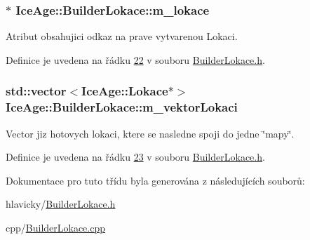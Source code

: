 \subsubsection[{\texorpdfstring{m\+\_\+lokace}{m_lokace}}]{$\ast$ Ice\+Age\+::\+Builder\+Lokace\+::m\+\_\+lokace\hspace{0.3cm}{\ttfamily [private]}}\hypertarget{classIceAge_1_1BuilderLokace_aad0fb17bf38c03cd767e100758348f24}{}\label{classIceAge_1_1BuilderLokace_aad0fb17bf38c03cd767e100758348f24}


Atribut obsahujici odkaz na prave vytvarenou Lokaci. 



Definice je uvedena na řádku \hyperlink{BuilderLokace_8h_source_l00022}{22} v souboru \hyperlink{BuilderLokace_8h_source}{Builder\+Lokace.\+h}.

\subsubsection[{\texorpdfstring{m\+\_\+vektor\+Lokaci}{m_vektorLokaci}}]{\setlength{\rightskip}{0pt plus 5cm}std\+::vector$<${\bf Ice\+Age\+::\+Lokace}$\ast$$>$ Ice\+Age\+::\+Builder\+Lokace\+::m\+\_\+vektor\+Lokaci\hspace{0.3cm}{\ttfamily [private]}}\hypertarget{classIceAge_1_1BuilderLokace_a110ada142d159f68fb82382a47d088f4}{}\label{classIceAge_1_1BuilderLokace_a110ada142d159f68fb82382a47d088f4}


Vector jiz hotovych lokaci, ktere se nasledne spoji do jedne \char`\"{}mapy\char`\"{}. 



Definice je uvedena na řádku \hyperlink{BuilderLokace_8h_source_l00023}{23} v souboru \hyperlink{BuilderLokace_8h_source}{Builder\+Lokace.\+h}.



Dokumentace pro tuto třídu byla generována z následujících souborů\+:\begin{DoxyCompactItemize}
\item 
hlavicky/\hyperlink{BuilderLokace_8h}{Builder\+Lokace.\+h}\item 
cpp/\hyperlink{BuilderLokace_8cpp}{Builder\+Lokace.\+cpp}\end{DoxyCompactItemize}
